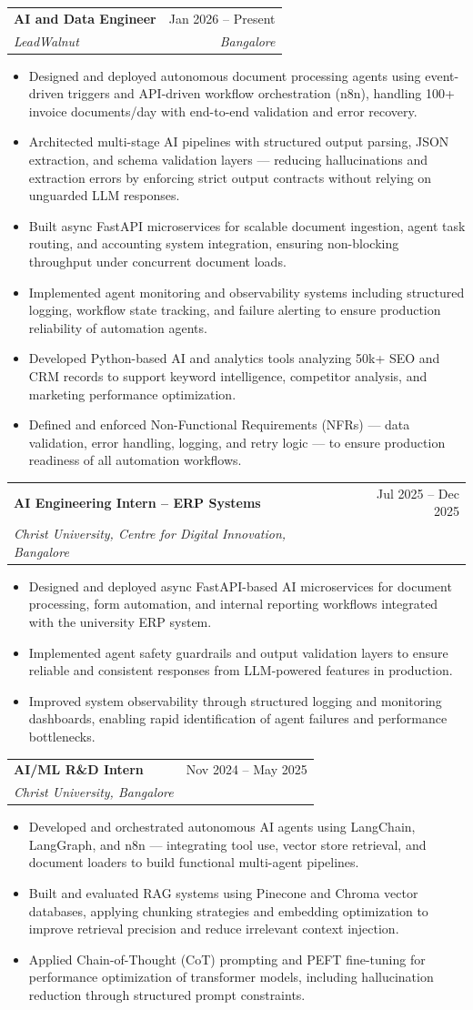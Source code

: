 \documentclass[letterpaper,11pt]{article}
\makeatletter
\newcommand{\resumeItem}[1]{\item\small{{#1 \vspace{-2pt}}}}
\newcommand{\resumeSubheading}[4]{
  \vspace{-2pt}\item
    \begin{tabular*}{0.97\textwidth}[t]{l@{\extracolsep{\fill}}r}
      \textbf{#1} & #2 \\
      \textit{\small#3} & \textit{\small #4} \\
    \end{tabular*}\vspace{-7pt}
}
\newcommand{\resumeItemListStart}{\begin{itemize}}
\newcommand{\resumeItemListEnd}{\end{itemize}\vspace{-5pt}}
\makeatother
\begin{document}
\resumeSubheading
{AI and Data Engineer}{Jan 2026 – Present}
{LeadWalnut}{Bangalore}
\resumeItemListStart

\resumeItem{Designed and deployed autonomous document processing agents using event-driven triggers and API-driven workflow orchestration (n8n), handling 100+ invoice documents/day with end-to-end validation and error recovery.}

\resumeItem{Architected multi-stage AI pipelines with structured output parsing, JSON extraction, and schema validation layers — reducing hallucinations and extraction errors by enforcing strict output contracts without relying on unguarded LLM responses.}

\resumeItem{Built async FastAPI microservices for scalable document ingestion, agent task routing, and accounting system integration, ensuring non-blocking throughput under concurrent document loads.}

\resumeItem{Implemented agent monitoring and observability systems including structured logging, workflow state tracking, and failure alerting to ensure production reliability of automation agents.}

\resumeItem{Developed Python-based AI and analytics tools analyzing 50k+ SEO and CRM records to support keyword intelligence, competitor analysis, and marketing performance optimization.}

\resumeItem{Defined and enforced Non-Functional Requirements (NFRs) — data validation, error handling, logging, and retry logic — to ensure production readiness of all automation workflows.}

\resumeItemListEnd

\resumeSubheading
{AI Engineering Intern – ERP Systems}{Jul 2025 – Dec 2025}
{Christ University, Centre for Digital Innovation, Bangalore}{}
\resumeItemListStart
  \resumeItem{Designed and deployed async FastAPI-based AI microservices for document processing, form automation, and internal reporting workflows integrated with the university ERP system.}
  \resumeItem{Implemented agent safety guardrails and output validation layers to ensure reliable and consistent responses from LLM-powered features in production.}
  \resumeItem{Improved system observability through structured logging and monitoring dashboards, enabling rapid identification of agent failures and performance bottlenecks.}
\resumeItemListEnd

\resumeSubheading
{AI/ML R\&D Intern}{Nov 2024 – May 2025}
{Christ University, Bangalore}{}
\resumeItemListStart
  \resumeItem{Developed and orchestrated autonomous AI agents using LangChain, LangGraph, and n8n — integrating tool use, vector store retrieval, and document loaders to build functional multi-agent pipelines.}
  \resumeItem{Built and evaluated RAG systems using Pinecone and Chroma vector databases, applying chunking strategies and embedding optimization to improve retrieval precision and reduce irrelevant context injection.}
  \resumeItem{Applied Chain-of-Thought (CoT) prompting and PEFT fine-tuning for performance optimization of transformer models, including hallucination reduction through structured prompt constraints.}
\resumeItemListEnd
\end{document}
